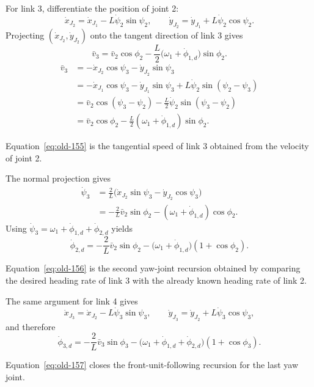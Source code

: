 \documentclass[12pt,a4paper]{report}
\newcommand{\formulaannotation}[1]{\par\noindent{}#1\par\vspace{0.35em}}
\begin{document}
For link 3, differentiate the position of joint 2:
\begin{equation}
\dot{x}_{J_2} = \dot{x}_{J_1} - L\dot{\psi}_2\sin\psi_2,
\qquad
\dot{y}_{J_2} = \dot{y}_{J_1} + L\dot{\psi}_2\cos\psi_2.
\end{equation}
Projecting $(\dot{x}_{J_2},\dot{y}_{J_2})$ onto the tangent direction of link 3 gives
\begin{equation}
\bar{v}_3 =
\bar{v}_2 \cos \phi_2 -
\frac{L}{2}
\bigl(
\omega_1 + \dot{\phi}_{1,d}
\bigr)
\sin \phi_2.
\label{eq:old-155}
\end{equation}
\begin{equation}
\begin{aligned}
\bar{v}_3
&= -\dot{x}_{J_2}\cos\psi_3 - \dot{y}_{J_2}\sin\psi_3 \\
&= -\dot{x}_{J_1}\cos\psi_3 - \dot{y}_{J_1}\sin\psi_3 + L\dot{\psi}_2\sin(\psi_2-\psi_3) \\
&= \bar{v}_2\cos(\psi_3-\psi_2) - \frac{L}{2}\dot{\psi}_2\sin(\psi_3-\psi_2) \\
&= \bar{v}_2 \cos \phi_2 - \frac{L}{2}(\omega_1 + \dot{\phi}_{1,d})\sin\phi_2.
\end{aligned}
\end{equation}
\formulaannotation{Equation~\eqref{eq:old-155} is the tangential speed of link 3 obtained from the velocity of joint 2.}

The normal projection gives
\begin{equation}
\begin{aligned}
\dot{\psi}_3
&=
\frac{2}{L}\bigl(\dot{x}_{J_2}\sin\psi_3 - \dot{y}_{J_2}\cos\psi_3\bigr) \\
&= -\frac{2}{L}\bar{v}_2\sin\phi_2 - (\omega_1 + \dot{\phi}_{1,d})\cos\phi_2.
\end{aligned}
\end{equation}
Using $\dot{\psi}_3 = \omega_1 + \dot{\phi}_{1,d} + \dot{\phi}_{2,d}$ yields
\begin{equation}
\dot{\phi}_{2,d} =
-\frac{2}{L} \bar{v}_2 \sin \phi_2 -
\bigl(
\omega_1 + \dot{\phi}_{1,d}
\bigr)
(1 + \cos \phi_2).
\label{eq:old-156}
\end{equation}
\formulaannotation{Equation~\eqref{eq:old-156} is the second yaw-joint recursion obtained by comparing the desired heading rate of link 3 with the already known heading rate of link 2.}

The same argument for link 4 gives
\begin{equation}
\dot{x}_{J_3} = \dot{x}_{J_2} - L\dot{\psi}_3\sin\psi_3,
\qquad
\dot{y}_{J_3} = \dot{y}_{J_2} + L\dot{\psi}_3\cos\psi_3,
\end{equation}
and therefore
\begin{equation}
\dot{\phi}_{3,d} =
-\frac{2}{L} \bar{v}_3 \sin \phi_3 -
\bigl(
\omega_1 + \dot{\phi}_{1,d} + \dot{\phi}_{2,d}
\bigr)
(1 + \cos \phi_3).
\label{eq:old-157}
\end{equation}
\formulaannotation{Equation~\eqref{eq:old-157} closes the front-unit-following recursion for the last yaw joint.}
\end{document}
